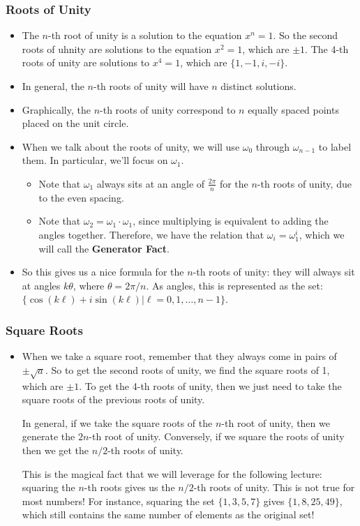 \subsubsection{Roots of Unity}
\begin{itemize}
	\item The \( n \)-th root of unity is a solution to the equation \( x^{n} = 1 \). So the second roots of uhnity are solutions 
		to the equation \( x^2 = 1 \), which are \( \pm 1 \). The 4-th roots of unity are solutions to \( x^{4} = 1 \), 
		which are \( \{1, -1, i, -i\}  \). 
	\item In general, the \( n \)-th roots of unity will have \( n \) distinct solutions. 
	\item Graphically, the \( n \)-th roots of unity correspond to \( n \) equally spaced points placed on the unit circle.   
	\item When we talk about the roots of unity, we will use \( \omega_0 \) through \( \omega_{n-1} \) to label them. In particular, 
		we'll focus on \( \omega_1 \).
		\begin{itemize}
			\item Note that \( \omega_1 \) always sits at an angle of \( \frac{2\pi}{n} \) for the \( n \)-th roots of unity, due 
				to the even spacing.
			\item Note that \( \omega_2 = \omega_1 \cdot \omega_1 \), since multiplying is equivalent to adding the angles together.
				Therefore, we have the relation that \( \omega_i = \omega_1^{i} \), which we will call the \textbf{Generator Fact}. 
		\end{itemize}
	\item So this gives us a nice formula for the \( n \)-th roots of unity: they will always sit at angles \( k\theta \), where 
		\( \theta = 2\pi / n \). As angles, this is represented as the set: \( \{\cos(k\ell) + i\sin(k\ell) | \ell= 0, 1, \dots, 
		n - 1\}  \).  
\end{itemize}
\subsubsection{Square Roots}
\begin{itemize}
	\item When we take a square root, remember that they always come in pairs of \( \pm \sqrt{a}  \). So to get the second 
		roots of unity, we find the square roots of 1, which are \(  \pm 1 \). To get the 4-th roots of unity, then we just need 
		to take the square roots of the previous roots of unity. 

		In general, if we take the square roots of the \( n \)-th root of unity, then we generate the \( 2n \)-th root of unity. 
		Conversely, if we square the roots of unity then we get the \( n / 2 \)-th roots of unity. 

		This is the magical fact that we will leverage for the following lecture: squaring the \( n \)-th roots gives us 
		the \( n / 2 \)-th roots of unity. This is not true for most numbers! For instance, squaring the set \( \{1, 3, 5, 7\}  \)
		gives \( \{1, 8, 25, 49\}  \), which still contains the same number of elements as the original set!
\end{itemize}
